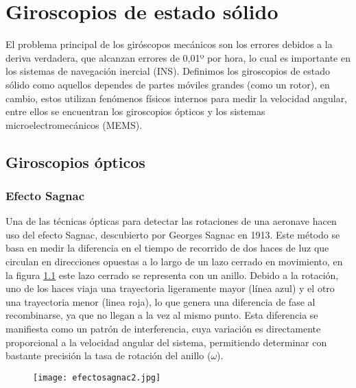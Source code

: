 \chapter{Giroscopios de estado sólido}
\chapterspaceabove{6.75cm} %
\chapterspacebelow{7.25cm} %


El problema principal de los giróscopos mecánicos son los errores debidos a la deriva verdadera, que alcanzan errores de 0,01º por hora, lo cual es importante en los sistemas de navegación inercial (INS). Definimos los giroscopios de estado sólido como aquellos dependes de partes móviles grandes (como un rotor), en cambio, estos utilizan fenómenos físicos internos para medir la velocidad angular, entre ellos se encuentran los giroscopios ópticos y los sistemas microelectromecánicos (MEMS).


\section{Giroscopios ópticos}
\subsection{Efecto Sagnac}
Una de las técnicas ópticas para detectar las rotaciones de una aeronave hacen  uso del efecto Sagnac, descubierto por Georges Sagnac en 1913. Este método se basa en medir la diferencia en el tiempo de recorrido de dos haces de luz que circulan en direcciones opuestas a lo largo de un lazo cerrado en movimiento, en la figura \ref{fig:efectosagnac} este lazo cerrado se representa con un anillo. Debido a la rotación, uno de los haces viaja una trayectoria ligeramente mayor (línea azul) y el otro una trayectoria menor (linea roja), lo que genera una diferencia de fase al recombinarse, ya que no llegan a la vez al mismo punto. Esta diferencia se manifiesta como un patrón de interferencia, cuya variación es directamente proporcional a la velocidad angular del sistema, permitiendo determinar con bastante precisión la tasa de rotación del anillo (\(\omega\)).\\

\begin{figure}[H]
    \centering
    \begin{minipage}{0.35\textwidth} 
        \centering
        \texttt{[image: efectosagnac2.jpg]} 
    \end{minipage}%
    \hfill
    \begin{minipage}{0.55\textwidth} %
    \end{minipage}
    \label{fig:efectosagnac}
\end{figure}

